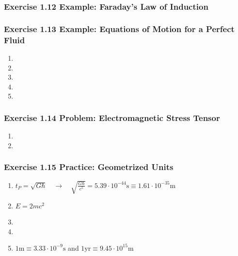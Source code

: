 \documentclass[10pt,a4paper]{book}
\theoremstyle{definition}
\begin{document}
\subsubsection{Exercise 1.12 Example: Faraday’s Law of Induction}

\subsubsection{Exercise 1.13 Example: Equations of Motion for a Perfect Fluid}
\begin{enumerate}[label=(\alph*)]
\item 
\item
\item
\item
\item
\end{enumerate}

\subsubsection{Exercise 1.14 Problem: Electromagnetic Stress Tensor}
\begin{enumerate}[label=(\alph*)]
\item
\item
\end{enumerate}

\subsubsection{Exercise 1.15 Practice: Geometrized Units}
\begin{enumerate}[label=(\alph*)]
\item $t_P=\sqrt{G\hbar}\quad\rightarrow\quad\sqrt{\frac{G\hbar}{c^5}}= 5.39\cdot10^{-44}\text{s}\equiv 1.61\cdot10^{-35}\text{m}$
\item $E=2mc^2$
\item 
\item 
\item $1\text{m}\equiv 3.33\cdot10^{-9}\text{s}$ and $1\text{yr}\equiv 9.45\cdot10^{15}\text{m}$
\end{enumerate}
\end{document}

